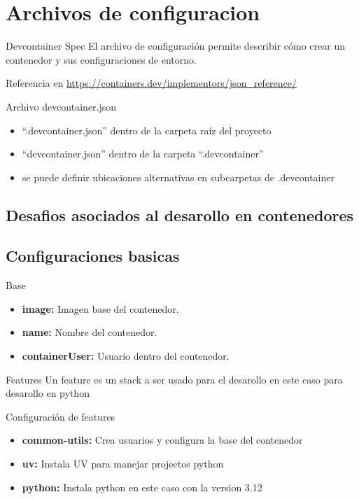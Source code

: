 \documentclass{beamer}
\begin{document}
\section{Archivos de configuracion}
\begin{frame}{Devcontainer Spec}
  El archivo de configuración permite describir cómo crear un contenedor y sus configuraciones de entorno.
  
  Referencia en \href{https://containers.dev/implementors/json_reference/}{https://containers.dev/implementors/json\_reference/}
  \begin{block}{Archivo devcontainer.json}
    \begin{itemize}
      \item “.devcontainer.json” dentro de la carpeta raíz del proyecto
      \item “devcontainer.json” dentro de la carpeta “.devcontainer”
      \item se puede definir ubicaciones alternativas en subcarpetas de .devcontainer
    \end{itemize}
  \end{block}
\end{frame}
\subsection{Desafios asociados al desarollo en contenedores}
\subsection{Configuraciones basicas}
\begin{frame}{\subsecname}
  
  \begin{block}{Base}
    \begin{itemize}
      \item \textbf{image:} Imagen base del contenedor.
      \item \textbf{name:} Nombre del contenedor.
      \item \textbf{containerUser:} Usuario dentro del contenedor.
    \end{itemize}
  \end{block}
\end{frame}
\begin{frame}{Features}
  Un feature es un stack a ser usado para el desarollo en este caso para desarollo en python
  
  \begin{block}{Configuración de features}
    \begin{itemize}
      \item \textbf{common-utils:} Crea usuarios y configura la base del contenedor
      \item \textbf{uv:} Instala UV para manejar projectos python
      \item \textbf{python:} Instala python en este caso con la version 3.12
    \end{itemize}
  \end{block}
\end{frame}
\end{document}
